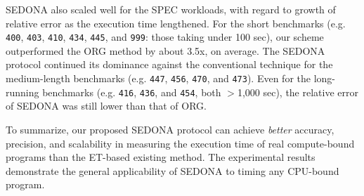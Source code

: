 \documentclass[letter]{ieice}
\begin{document}
SEDONA also scaled well for the SPEC workloads, 
with regard to growth of relative error as the execution time lengthened.
For the short benchmarks 
(e.g. {\tt 400}, {\tt 403}, {\tt 410}, 
{\tt 434}, {\tt 445}, and {\tt 999}: those taking \hbox{under} 100 sec), 
our scheme outperformed the ORG method by about 3.5x, on average. 
The SEDONA protocol continued its dominance against the conventional technique 
for the medium-length benchmarks (e.g. {\tt 447}, {\tt 456}, {\tt 470}, and {\tt 473}).
Even for the long-running benchmarks (e.g. {\tt 416}, {\tt 436}, and {\tt 454}, both $>$1,000 sec), 
the relative error of \hbox{SEDONA} was still lower than that of ORG.

To summarize, our proposed SEDONA protocol can achieve {\em better} accuracy,
precision, and scalability in measuring the execution time of real \hbox{compute-bound} programs 
than the ET-based existing method. 
The experimental results demonstrate 
the general applicability of SEDONA to timing any CPU-bound program.
\end{document}
